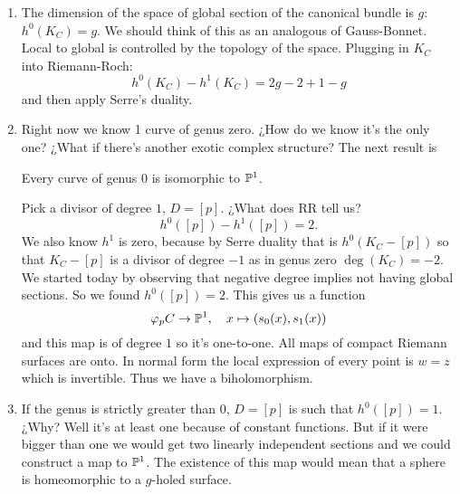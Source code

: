\documentclass[12pt]{memoir}
\begin{document}
\begin{enumerate}
    \item The dimension of the space of global section of the canonical bundle is $g$: $h^0(K_C)=g$. We should think of this as an analogous of Gauss-Bonnet. Local to global is controlled by the topology of the space. Plugging in $K_C$ into Riemann-Roch:
    $$h^0(K_C)-h^1(K_C)=2g-2+1-g$$
    and then apply Serre's duality.
    \item Right now we know 1 curve of genus zero. ¿How do we know it's the only one? ¿What if there's another exotic complex structure? The next result is 
    \begin{significant}
        Every curve of genus 0 is isomorphic to $\mathbb{P}^1$.
    \end{significant}
    Pick a divisor of degree $1$, $D=[p]$. ¿What does RR tell us?
    $$h^0([p])-h^1([p])=2.$$
    We also know $h^1$ is zero, because by Serre duality that is $h^0(K_C-[p])$ so that $K_C-[p]$ is a divisor of degree $-1$ as in genus zero $\deg(K_C)=-2$. We started today by observing that negative degree implies not having global sections. So we found $h^0([p])=2$. This gives us a function 
    $$\varphi_pC\to\mathbb{P}^1,\quad x\mapsto(s_0(x),s_1(x))$$
    and this map is of degree $1$ so it's one-to-one. All maps of compact Riemann surfaces are onto. In normal form the local expression of every point is $w=z$ which is invertible. Thus we have a biholomorphism.
    \item If the genus is strictly greater than $0$, $D=[p]$ is such that $h^0([p])=1$. ¿Why? Well it's at least one because of constant functions. But if it were bigger than one we would get two linearly independent sections and we could construct a map to $\mathbb{P}^1$. The existence of this map would mean that a sphere is homeomorphic to a $g$-holed surface.
\end{enumerate}

\ifx\nextra\undefined
\printindex
\else\fi
\nocite{*}


\end{document}
